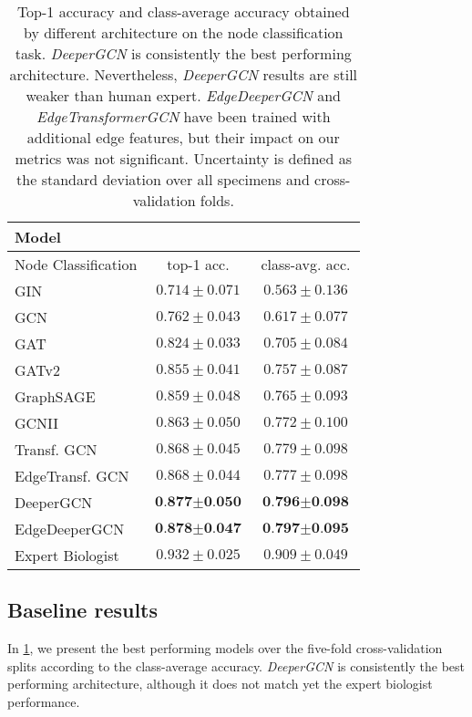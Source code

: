 \documentclass[10pt,twocolumn,letterpaper]{article}
\begin{document}
\begin{table}
  \centering
  \begin{tabular}{@{}lcc@{}}
    \toprule
    Model \\
    \midrule
    Node Classification & top-1 acc. & class-avg. acc.\\
    \midrule
    GIN \cite{xu2018powerful} & $0.714 \pm 0.071$ & $0.563 \pm 0.136$ \\
    GCN \cite{kipf2016semi} & $0.762 \pm 0.043$ & $0.617 \pm 0.077$ \\ 
    GAT \cite{velickovic2018graph} & $0.824 \pm 0.033$ & $0.705 \pm 0.084$ \\
    GATv2 \cite{brody2021attentive} & $0.855 \pm 0.041$ & $0.757 \pm 0.087$ \\
    GraphSAGE \cite{hamilton2017inductive} & $0.859 \pm 0.048$ & $0.765 \pm 0.093$ \\
    GCNII \cite{chen2020simple} & $0.863 \pm 0.050$ & $0.772 \pm 0.100$ \\
    Transf. GCN \cite{shi2020masked} & $0.868 \pm 0.045$ & $0.779 \pm 0.098$ \\
    EdgeTransf. GCN \cite{shi2020masked} &$0.868 \pm 0.044$ & $0.777 \pm 0.098$ \\
    DeeperGCN \cite{li2020deepergcn} &  $\textbf{0.877} \pm \textbf{0.050}$ & $\textbf{0.796} \pm \textbf{0.098}$ \\ 
    EdgeDeeperGCN \cite{li2020deepergcn} & $\textbf{0.878} \pm \textbf{0.047}$ & $\textbf{0.797} \pm \textbf{0.095}$ \\  
    \midrule
    Expert Biologist & $0.932 \pm 0.025$ & $0.909 \pm 0.049$ \\ 
    \bottomrule
  \end{tabular}
  \caption{Top-1 accuracy and class-average accuracy obtained by different architecture on the node classification task. \textit{DeeperGCN} is consistently the best performing architecture. Nevertheless, \textit{DeeperGCN} results are still weaker than human expert. \textit{EdgeDeeperGCN} and \textit{EdgeTransformerGCN} have been trained with additional edge features, but their impact on our metrics was not significant. Uncertainty is defined as the standard deviation over all specimens and cross-validation folds.}
  \label{tab:node_class_eval}
\end{table}

\subsection{Baseline results}
\label{subsec:res}
In \cref{tab:node_class_eval}, we present the best performing models over the five-fold cross-validation splits according to the class-average accuracy. \textit{DeeperGCN} is consistently the best performing architecture, although it does not match yet the expert biologist performance.
\end{document}
